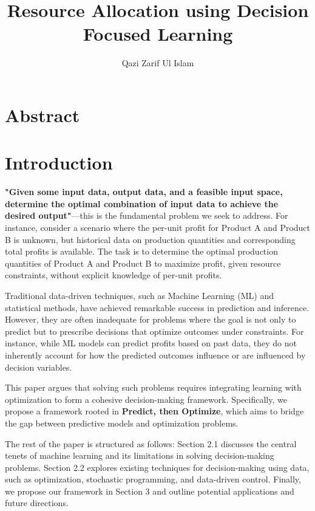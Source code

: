 \documentclass[12pt, letterpaper]{article}
\title{Resource Allocation using Decision Focused Learning}
\author{Qazi Zarif Ul Islam}
\begin{document}
\maketitle

\section{Abstract}

\section{Introduction}

\textbf{"Given some input data, output data, and a feasible input space,
determine the optimal combination of input data to achieve the desired
output"}—this is the fundamental problem we seek to address. For instance,
consider a scenario where the per-unit profit for Product A and Product B is
unknown, but historical data on production quantities and corresponding total
profits is available. The task is to determine the optimal production quantities
of Product A and Product B to maximize profit, given resource constraints,
without explicit knowledge of per-unit profits.

Traditional data-driven techniques, such as Machine Learning (ML) and
statistical methods, have achieved remarkable success in prediction and
inference. However, they are often inadequate for problems where the goal is not
only to predict but to prescribe decisions that optimize outcomes under
constraints. For instance, while ML models can predict profits based on past
data, they do not inherently account for how the predicted outcomes influence or
are influenced by decision variables.

This paper argues that solving such problems requires integrating learning with
optimization to form a cohesive decision-making framework. Specifically, we
propose a framework rooted in \textbf{Predict, then Optimize}, which aims to
bridge the gap between predictive models and optimization problems.

The rest of the paper is structured as follows: Section 2.1 discusses the
central tenets of machine learning and its limitations in solving
decision-making problems. Section 2.2 explores existing techniques for
decision-making using data, such as optimization, stochastic programming, and
data-driven control. Finally, we propose our framework in Section 3 and outline
potential applications and future directions.
\end{document}
